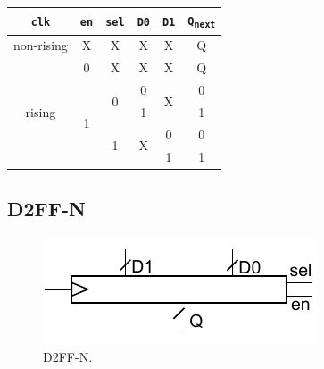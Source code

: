 \begin{table}[H]
\centering
\begin{tabular}{|c|c|c|c|c|c|}
\hline
\texttt{clk}            & \texttt{en}        & \texttt{sel}       & \texttt{D0}        & \texttt{D1}        & \texttt{Q\textsubscript{next}} \\ \hline
non-rising              & X                  & X                  & X                  & X                  & Q                    \\ \hline
\multirow{5}{*}{rising} & 0                  & X                  & X                  & X                  & Q                    \\ \cline{2-6} 
                        & \multirow{4}{*}{1} & \multirow{2}{*}{0} & 0                  & \multirow{2}{*}{X} & 0                    \\ \cline{4-4} \cline{6-6} 
                        &                    &                    & 1                  &                    & 1                    \\ \cline{3-6} 
                        &                    & \multirow{2}{*}{1} & \multirow{2}{*}{X} & 0                  & 0                    \\ \cline{5-6} 
                        &                    &                    &                    & 1                  & 1                    \\ \hline
\end{tabular}
\end{table}

\subsection{D2FF-N}\label{subsec:d2ffn}

\begin{figure}[H]
    \begin{center}
        \includegraphics[scale=1.3,clip]{img/DFF_N_block.pdf}
    \end{center}
    \vspace*{-0.5cm}
    \caption{D2FF-N.}
    \label{fig:DFFNblock}
\end{figure}

